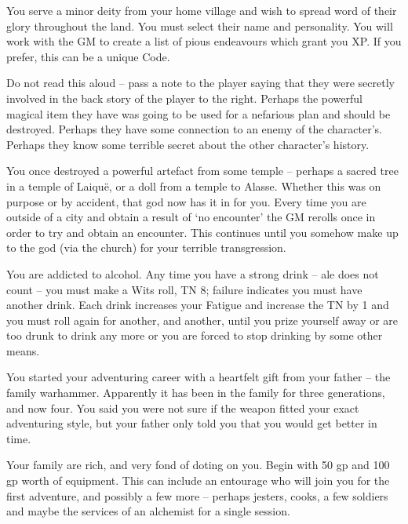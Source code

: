 \begin{list}{\addtocounter{list}{1}\textbf{:}}{\raggedleft}
\item{You serve a minor deity from your home village and wish to spread word of their glory throughout the land.  You must select their name and personality.  You will work with the GM to create a list of pious endeavours which grant you XP.  If you prefer, this can be a unique Code.}

\item{Do not read this aloud -- pass a note to the player saying that they were secretly involved in the back story of the player to the right.  Perhaps the powerful magical item they have was going to be used for a nefarious plan and should be destroyed.  Perhaps they have some connection to an enemy of the character's.  Perhaps they know some terrible secret about the other character's history.}

\item{You once destroyed a powerful artefact from some temple -- perhaps a sacred tree in a temple of Laiqu\"{e}, or a doll from a temple to Alasse. Whether this was on purpose or by accident, that god now has it in for you.  Every time you are outside of a city and obtain a result of `no encounter' the GM rerolls once in order to try and obtain an encounter. This continues until you somehow make up to the god (via the church) for your terrible transgression.}

\item{You are addicted to alcohol.  Any time you have a strong drink -- ale does not count -- you must make a Wits roll, TN 8; failure indicates you must have another drink.  Each drink increases your Fatigue and increase the TN by 1 and you must roll again for another, and another, until you prize yourself away or are too drunk to drink any more or you are forced to stop drinking by some other means.}

\item{You started your adventuring career with a heartfelt gift from your father -- the family warhammer.  Apparently it has been in the family for three generations, and now four.  You said you were not sure if the weapon fitted your exact adventuring style, but your father only told you that you would get better in time.}

\item{Your family are rich, and very fond of doting on you.  Begin with 50 gp and 100 gp worth of equipment.  This can include an entourage who will join you for the first adventure, and possibly a few more -- perhaps jesters, cooks, a few soldiers and maybe the services of an alchemist for a single session.}


\end{list}
